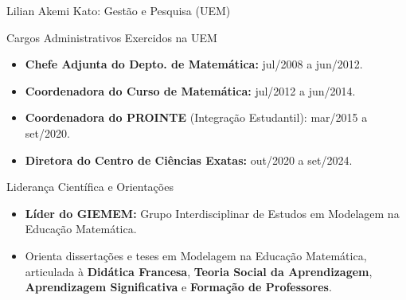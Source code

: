 \documentclass[10pt, aspectratio=169]{beamer}
\begin{document}
\begin{frame}{Lilian Akemi Kato: Gestão e Pesquisa (UEM)}
    \transdissolve[duration=0.4]
    \footnotesize
    \begin{block}{Cargos Administrativos Exercidos na UEM}
        \begin{itemize}
            \item \textbf{Chefe Adjunta do Depto. de Matemática:} jul/2008 a jun/2012.
            \item \textbf{Coordenadora do Curso de Matemática:} jul/2012 a jun/2014.
            \item \textbf{Coordenadora do PROINTE} (Integração Estudantil): mar/2015 a set/2020.
            \item \textbf{Diretora do Centro de Ciências Exatas:} out/2020 a set/2024.
        \end{itemize}
    \end{block}
    \pause
    \begin{exampleblock}{Liderança Científica e Orientações}
        \begin{itemize}
            \item \textbf{Líder do GIEMEM:} Grupo Interdisciplinar de Estudos em Modelagem na Educação Matemática.
            \item Orienta dissertações e teses em Modelagem na Educação Matemática, articulada à \textbf{Didática Francesa}, \textbf{Teoria Social da Aprendizagem}, \textbf{Aprendizagem Significativa} e \textbf{Formação de Professores}.
        \end{itemize}
    \end{exampleblock}
\end{frame}
\end{document}
